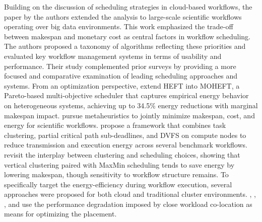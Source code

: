 Building on the discussion of scheduling strategies in cloud-based workflows, the paper by \cite{9284517} the authors extended the analysis to large-scale scientific workflows operating over big data environments. This work emphasized the trade-off between makespan and monetary cost as central factors in workflow scheduling. The authors proposed a taxonomy of algorithms reflecting these priorities and evaluated key workflow management systems in terms of usability and performance. Their study complemented prior surveys by providing a more focused and comparative examination of leading scheduling approaches and systems.
From an optimization perspective, \cite{Durillo_2014} extend HEFT into MOHEFT, a Pareto-based multi-objective scheduler that captures empirical energy behavior on heterogeneous systems, achieving up to 34.5\% energy reductions with marginal makespan impact.
\cite{Mohammadzadeh_2020} pursue metaheuristics to jointly minimize makespan, cost, and energy for scientific workflows.
\cite{Choudhary_2022} propose a framework that combines task clustering, partial critical path sub-deadlines, and DVFS on compute nodes to reduce transmission and execution energy across several benchmark workflows.
\cite{Saadi_2023} revisit the interplay between clustering and scheduling choices, showing that vertical clustering paired with MaxMin scheduling tends to save energy by lowering makespan, though sensitivity to workflow structure remains.
To specifically target the energy-efficiency during workflow execution, several approaches were proposed for both cloud and traditional cluster environments. \cite{Lee2012}, \cite{Chen_2023_9beb}, \cite{Blagodurov_2015}, \cite{abdessamia2020energy} and \cite{10.1007/978-3-031-23092-9_35} use the performance degradation imposed by close workload co-location as means for optimizing the placement.


